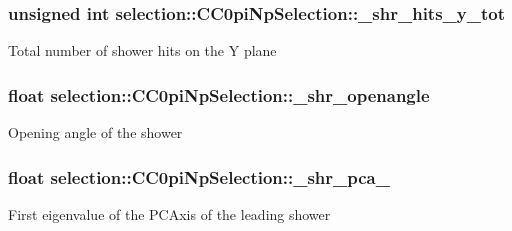\subsubsection[{\texorpdfstring{\+\_\+shr\+\_\+hits\+\_\+y\+\_\+tot}{_shr_hits_y_tot}}]{\setlength{\rightskip}{0pt plus 5cm}unsigned int selection\+::\+C\+C0pi\+Np\+Selection\+::\+\_\+shr\+\_\+hits\+\_\+y\+\_\+tot\hspace{0.3cm}{\ttfamily [private]}}\hypertarget{classselection_1_1CC0piNpSelection_a6a43c3523af47860ad1682ebe14bb8e3}{}\label{classselection_1_1CC0piNpSelection_a6a43c3523af47860ad1682ebe14bb8e3}
Total number of shower hits on the Y plane 
\subsubsection[{\texorpdfstring{\+\_\+shr\+\_\+openangle}{_shr_openangle}}]{\setlength{\rightskip}{0pt plus 5cm}float selection\+::\+C\+C0pi\+Np\+Selection\+::\+\_\+shr\+\_\+openangle\hspace{0.3cm}{\ttfamily [private]}}\hypertarget{classselection_1_1CC0piNpSelection_a33b26acb3cdb05cb1b81800d8af48a03}{}\label{classselection_1_1CC0piNpSelection_a33b26acb3cdb05cb1b81800d8af48a03}
Opening angle of the shower 
\subsubsection[{\texorpdfstring{\+\_\+shr\+\_\+pca\+\_\+0}{_shr_pca_0}}]{\setlength{\rightskip}{0pt plus 5cm}float selection\+::\+C\+C0pi\+Np\+Selection\+::\+\_\+shr\+\_\+pca\+\_\hspace{0.3cm}{\ttfamily [private]}}\hypertarget{classselection_1_1CC0piNpSelection_a47b08d4ae98f51032f431873321914a5}{}\label{classselection_1_1CC0piNpSelection_a47b08d4ae98f51032f431873321914a5}
First eigenvalue of the P\+C\+Axis of the leading shower 
